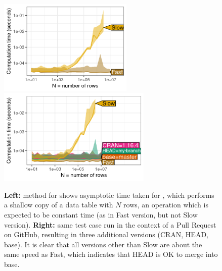 \begin{figure}[t]
    \centering
    \includegraphics[height=1.8in]{data.table-atime_versions.png}
\includegraphics[height=1.8in]{data.table-atime_test.png}
     \caption{\textbf{Left:}  method for  shows asymptotic time taken for , which performs a shallow copy of a data table with $N$ rows, an operation which is expected to be constant time (as in Fast version, but not Slow version).
     \textbf{Right:} same test case run in the context of a Pull Request on GitHub, resulting in three additional versions (CRAN, HEAD, base).
     It is clear that all versions other than Slow are about the same speed as Fast, which indicates that HEAD is OK to merge into base.}
    \label{fig:plot-perf-test-fast-slow}
\end{figure}


